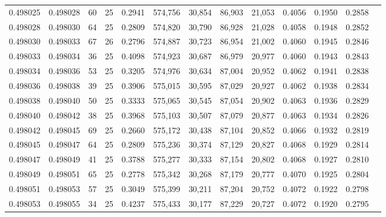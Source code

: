 \begin{tabular}{rrrrrrrrrrrrr}
0.498025 & 0.498028 &    60 &  25 &                                     0.2941 & 574,756 &  30,854 &  86,903 &  21,053 & 0.4056 & 0.1950 & 0.2858 \\
0.498028 & 0.498030 &    64 &  25 &                                     0.2809 & 574,820 &  30,790 &  86,928 &  21,028 & 0.4058 & 0.1948 & 0.2852 \\
0.498030 & 0.498033 &    67 &  26 &                                     0.2796 & 574,887 &  30,723 &  86,954 &  21,002 & 0.4060 & 0.1945 & 0.2846 \\
0.498033 & 0.498034 &    36 &  25 &                                     0.4098 & 574,923 &  30,687 &  86,979 &  20,977 & 0.4060 & 0.1943 & 0.2843 \\
0.498034 & 0.498036 &    53 &  25 &                                     0.3205 & 574,976 &  30,634 &  87,004 &  20,952 & 0.4062 & 0.1941 & 0.2838 \\
0.498036 & 0.498038 &    39 &  25 &                                     0.3906 & 575,015 &  30,595 &  87,029 &  20,927 & 0.4062 & 0.1938 & 0.2834 \\
0.498038 & 0.498040 &    50 &  25 &                                     0.3333 & 575,065 &  30,545 &  87,054 &  20,902 & 0.4063 & 0.1936 & 0.2829 \\
0.498040 & 0.498042 &    38 &  25 &                                     0.3968 & 575,103 &  30,507 &  87,079 &  20,877 & 0.4063 & 0.1934 & 0.2826 \\
0.498042 & 0.498045 &    69 &  25 &                                     0.2660 & 575,172 &  30,438 &  87,104 &  20,852 & 0.4066 & 0.1932 & 0.2819 \\
0.498045 & 0.498047 &    64 &  25 &                                     0.2809 & 575,236 &  30,374 &  87,129 &  20,827 & 0.4068 & 0.1929 & 0.2814 \\
0.498047 & 0.498049 &    41 &  25 &                                     0.3788 & 575,277 &  30,333 &  87,154 &  20,802 & 0.4068 & 0.1927 & 0.2810 \\
0.498049 & 0.498051 &    65 &  25 &                                     0.2778 & 575,342 &  30,268 &  87,179 &  20,777 & 0.4070 & 0.1925 & 0.2804 \\
0.498051 & 0.498053 &    57 &  25 &                                     0.3049 & 575,399 &  30,211 &  87,204 &  20,752 & 0.4072 & 0.1922 & 0.2798 \\
0.498053 & 0.498055 &    34 &  25 &                                     0.4237 & 575,433 &  30,177 &  87,229 &  20,727 & 0.4072 & 0.1920 & 0.2795 \\

\end{tabular}
